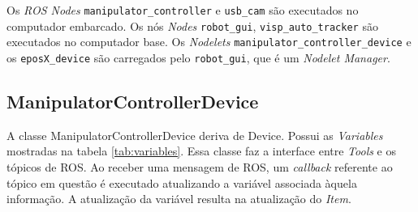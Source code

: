 Os \textit{ROS Nodes} \verb|manipulator_controller| e \verb|usb_cam| são executados no computador embarcado. Os nós \textit{Nodes} \verb|robot_gui|, \verb|visp_auto_tracker| são executados no computador base. Os \textit{Nodelets} \verb|manipulator_controller_device| e os \verb|eposX_device| são carregados pelo \verb|robot_gui|, que é um \textit{Nodelet Manager}. 

\subsection{ManipulatorControllerDevice}

A classe ManipulatorControllerDevice deriva de Device. Possui as \textit{Variables} mostradas na tabela \ref{tab:variables}. Essa classe faz a interface entre \textit{Tools} e os tópicos de ROS. Ao receber uma mensagem de ROS, um \textit{callback} referente ao tópico em questão é executado atualizando a variável associada àquela informação. A atualização da variável resulta na atualização do \textit{Item}.

